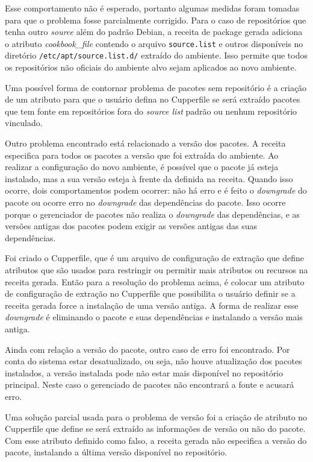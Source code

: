 Esse comportamento não é esperado, portanto algumas medidas foram tomadas para
que o problema fosse parcialmente corrigido. Para o caso de repositórios que
tenha outro \textit{source} além do padrão Debian, a receita de package gerada adiciona
o atributo \textit{cookbook\_file} contendo o arquivo \texttt{source.list} e outros disponíveis
no diretório \texttt{/etc/apt/source.list.d/} extraído do ambiente. Isso permite
que todos os repositórios não oficiais do ambiente alvo sejam aplicados ao novo ambiente.

Uma possível forma de contornar problema de pacotes sem repositório é
a criação de um atributo para que o usuário defina no Cupperfile se
será extraído pacotes que tem fonte em repositórios fora do \textit{source list} padrão ou
nenhum repositório vinculado.

Outro problema encontrado está relacionado a versão dos pacotes.
A receita especifica para todos os pacotes a versão que foi extraída do ambiente.
Ao realizar a configuração do novo ambiente, é possível que o pacote já esteja instalado,
mas a sua versão esteja à frente da definida na receita. Quando isso ocorre, dois comportamentos
podem ocorrer: não há erro e é feito o \textit{downgrade} do pacote ou ocorre erro no \textit{downgrade} das
dependências do pacote. Isso ocorre porque o gerenciador de pacotes não realiza o \textit{downgrade}
das dependências, e as versões antigas dos pacotes podem exigir as versões antigas das suas
dependências.

Foi criado o Cupperfile, que é um arquivo de configuração de extração que define atributos
que são usados para restringir ou permitir mais atributos ou recursos na receita gerada.
Então para a resolução do problema acima, é colocar um atributo de configuração de extração no
Cupperfile que possibilita o usuário definir se a receita gerada force a instalação de uma
versão antiga. A forma de realizar esse \textit{downgrade} é eliminando o pacote e suas dependências
e instalando a versão mais antiga.

Ainda com relação a versão do pacote, outro caso de erro foi encontrado.
Por conta do sistema estar desatualizado, ou seja, não houve atualização dos pacotes
instalados, a versão instalada pode não estar mais disponível no repositório principal.
Neste caso o gerenciado de pacotes não encontrará a fonte e acusará erro.

Uma solução parcial usada para o problema de versão foi a criação de atributo no
Cupperfile que define se será extraído as informações de versão ou não do pacote.
Com esse atributo definido como falso, a receita gerada não especifica a versão
do pacote, instalando a última versão disponível no repositório.
